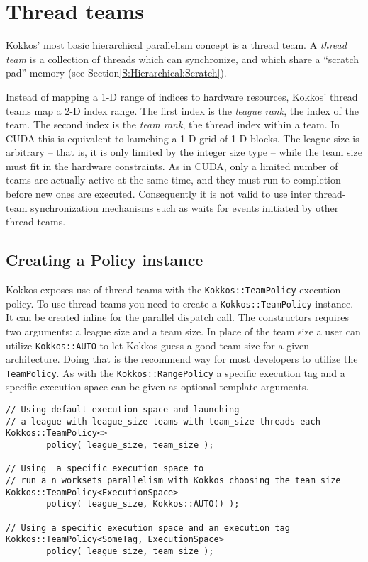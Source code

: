\section{Thread teams}\label{S:Hierarchical:Teams}

Kokkos' most basic hierarchical parallelism concept is a thread team.
A \emph{thread team} is a collection of threads which can synchronize,
and which share a ``scratch pad'' memory
(see Section\ref {S:Hierarchical:Scratch}).

Instead of mapping a 1-D range of indices to hardware resources,
Kokkos' thread teams map a 2-D index range.
The first index is the \emph{league rank}, the index of the team.
The second index is the \emph{team rank}, the thread index within a team.
In CUDA this is equivalent to launching a 1-D grid of 1-D blocks.
The league size is arbitrary -- that is, it is only limited by the integer size type -- while the team size must fit in the hardware constraints.
As in CUDA, only a limited number of teams are actually active at the same time,
and they must run to completion before new ones are executed. 
Consequently it is not valid to use inter thread-team synchronization mechanisms
such as waits for events initiated by other thread teams. 

\subsection{Creating a Policy instance}\label{SS:Hierarchical:Teams:Policy}

Kokkos exposes use of thread teams with the \lstinline!Kokkos::TeamPolicy! execution policy.
To use thread teams you need to create a \lstinline|Kokkos::TeamPolicy| instance.
It can be created inline for the parallel dispatch call.
The constructors requires two arguments: a league size and a team size. 
In place of the team size a user can utilize \lstinline|Kokkos::AUTO| to let Kokkos guess a good team size for a given architecture.
Doing that is the recommend way for most developers to utilize the \lstinline|TeamPolicy|.
As with the  \lstinline|Kokkos::RangePolicy| a specific execution tag and a specific execution space can be given as optional template arguments.
\begin{lstlisting}
// Using default execution space and launching 
// a league with league_size teams with team_size threads each
Kokkos::TeamPolicy<> 
        policy( league_size, team_size ); 

// Using  a specific execution space to 
// run a n_worksets parallelism with Kokkos choosing the team size
Kokkos::TeamPolicy<ExecutionSpace> 
        policy( league_size, Kokkos::AUTO() );

// Using a specific execution space and an execution tag 
Kokkos::TeamPolicy<SomeTag, ExecutionSpace> 
        policy( league_size, team_size ); 
\end{lstlisting}


